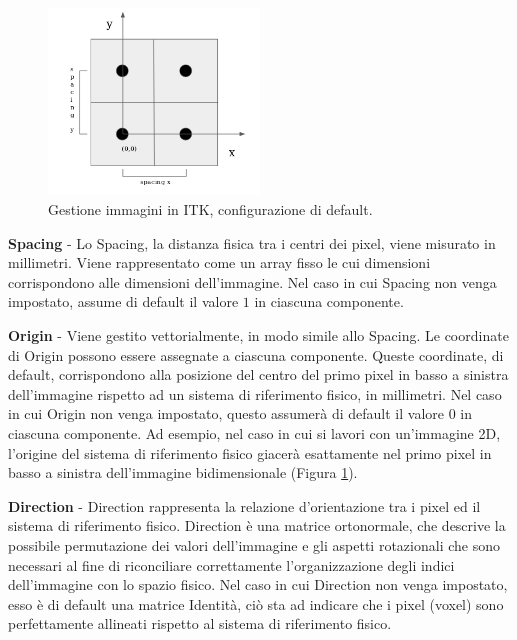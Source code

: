 \documentclass[a4paper,12pt, doubleside]{report}
\begin{document}
                \begin{figure}[h]
                    \centering
                    \includegraphics[width=0.5\textwidth]{itk}
                    \caption{Gestione immagini in ITK, configurazione di default.}
                    \label{fig:itk}        
                \end{figure}
                
                \bigskip
                \textbf{Spacing} - Lo Spacing, la distanza fisica tra i centri dei pixel, viene misurato in millimetri. Viene rappresentato come un array fisso le cui dimensioni corrispondono alle dimensioni dell'immagine. Nel caso in cui Spacing non venga impostato, assume di default il valore $1$ in ciascuna componente.
                
                \bigskip
                \textbf{Origin} - Viene gestito vettorialmente, in modo simile allo Spacing. Le coordinate di Origin possono essere assegnate a ciascuna componente. Queste coordinate, di default, corrispondono alla posizione del centro del primo pixel in basso a sinistra dell'immagine rispetto ad un sistema di riferimento fisico, in millimetri. Nel caso in cui Origin non venga impostato, questo assumerà di default il valore $0$ in ciascuna componente. Ad esempio, nel caso in cui si lavori con un'immagine 2D, l'origine del sistema di riferimento fisico giacerà esattamente nel primo pixel in basso a sinistra dell'immagine bidimensionale (Figura \ref{fig:itk}). 
                
                \bigskip
                \textbf{Direction} - Direction rappresenta la relazione d'orientazione tra i pixel ed il sistema di riferimento fisico. Direction è una matrice ortonormale, che descrive la possibile permutazione dei valori dell'immagine e gli aspetti rotazionali che sono necessari al fine di riconciliare correttamente l'organizzazione degli indici dell'immagine con lo spazio fisico. Nel caso in cui Direction non venga impostato, esso è di default una matrice Identità, ciò sta ad indicare che i pixel (voxel) sono perfettamente allineati rispetto al sistema di riferimento fisico.
                
\end{document}
